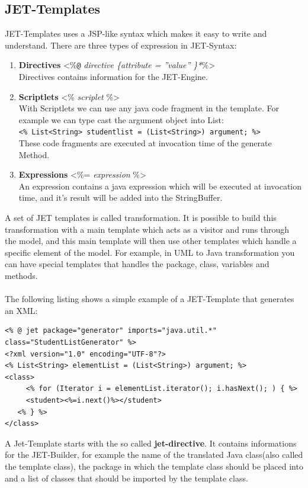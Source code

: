 \subsection{JET-Templates}
JET-Templates uses a JSP-like syntax which makes it easy to write and understand. There are three types of expression in JET-Syntax:
\begin{enumerate}
	\item \textbf{Directives} <\%\verb|@| \textit{directive \{attribute =  ''value''  \}*}\%>\\
	      Directives contains information for the JET-Engine. 
	      
	\item \textbf{Scriptlets} <\% \textit{scriplet} \%>\\
	      With Scriptlets we can use any java code fragment in the template. 
	      For example we can type cast the argument object into List:\\ 
	      \lstinline{<% List<String> studentlist = (List<String>) argument; %>} \\
	      These code fragments are executed at invocation time of the generate Method.
	      
	\item \textbf{Expressions} <\%= \textit{expression} \%>\\
	      An expression contains a java expression which will be executed at invocation time, and it's result will be added into the StringBuffer.
\end{enumerate}

A set of JET templates is called transformation. It is possible to build this transformation with a main template which acts as a visitor and runs through the model, and this main template will then use other templates which handle a specific element of the model. For example, in UML to Java transformation you can have special templates that handles the package, class, variables and methods.\\\\
The following listing shows a simple example of a JET-Template that generates an XML:
\begin{lstlisting}[caption = a simple JET-Template]
<% @ jet package="generator" imports="java.util.*" class="StudentListGenerator" %> 
<?xml version="1.0" encoding="UTF-8"?>
<% List<String> elementList = (List<String>) argument; %>
<class>
	 <% for (Iterator i = elementList.iterator(); i.hasNext(); ) { %>
     <student><%=i.next()%></student>
   <% } %>
</class>
\end{lstlisting}
A Jet-Template starts with the so called \textbf{jet-directive}. It contains informations for the JET-Builder, for example the name of the translated Java class(also called the template class), the package in which the template class should be placed into and a list of classes that should be imported by the template class.


